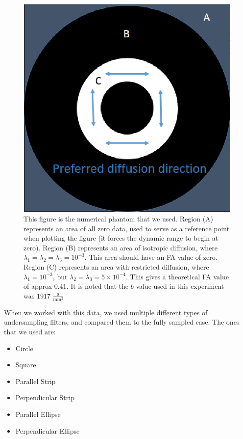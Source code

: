 \documentclass[11 pt]{article}
\begin{document}
      \begin{figure}[!h] 

        \centering
        \vspace{0pt}
        \setlength\fboxsep{0pt}
        \setlength\fboxrule{0.5pt}
        \includegraphics[trim = {0mm 0mm 0mm 0mm},clip,scale = 0.8] {Figs/numericalSims/Phantom.eps}
        \caption{This figure is the numerical phantom that we used. Region (A) represents an area of all zero data, used to serve as a reference point when plotting the figure (it forces the dynamic range to begin at zero). Region (B) represents an area of isotropic diffusion, where $\lambda_1 = \lambda_2 = \lambda_3 = 10^{-3}$. This area should have an FA value of zero. Region (C) represents an area with restricted diffusion, where $\lambda_1 = 10^{-3}$, but $\lambda_2 = \lambda_3 = 5 \times 10^{-4}$. This gives a theoretical FA value of approx $0.41$. It is noted that the $b$ value used in this experiment was 1917 $\frac{\text{s}}{\text{mm}^2}$}
        \label{fig:NumPhant}

        \end{figure}
    
    
      When we worked with this data, we used multiple different types of undersampling filters, and compared them to the fully sampled case. The ones that we used are:
      \begin{itemize}
        \item Circle
        \item Square
        \item Parallel Strip
        \item Perpendicular Strip
        \item Parallel Ellipse
        \item Perpendicular Ellipse
        \end{itemize}
\end{document}
